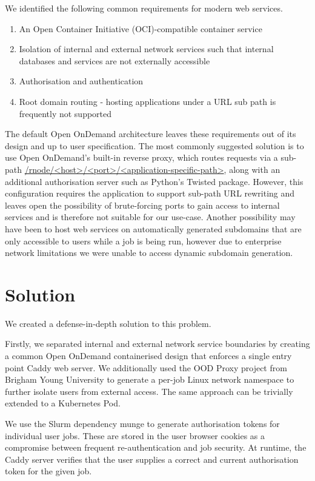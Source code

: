 \documentclass[sigconf,authordraft]{acmart}
\begin{document}
We identified the following common requirements for modern web services.
\begin{enumerate}
    \item An Open Container Initiative (OCI)-compatible container service
    \item Isolation of internal and external network services such that internal databases and services are not externally accessible
    \item Authorisation and authentication
    \item Root domain routing - hosting applications under a URL sub path is frequently not supported
\end{enumerate}
The default Open OnDemand architecture \cite{OODArch} leaves these requirements out of its design and up to user specification. The most commonly suggested solution is to use Open OnDemand's built-in reverse proxy, which routes requests via a sub-path \url{/rnode/<host>/<port>/<application-specific-path>}, along with an additional authorisation server such as Python's Twisted package. However, this configuration requires the application to support sub-path URL rewriting and leaves open the possibility of brute-forcing ports to gain access to internal services and is therefore not suitable for our use-case. Another possibility may have been to host web services on automatically generated subdomains that are only accessible to users while a job is being run, however due to enterprise network limitations we were unable to access dynamic subdomain generation.

\section{Solution}
We created a defense-in-depth solution to this problem.

Firstly, we separated internal and external network service boundaries by creating a common Open OnDemand containerised design that enforces a single entry point Caddy web server. We additionally used the OOD Proxy project from Brigham Young University \cite{noauthor_byuhpcoodproxy_2025} to generate a per-job Linux network namespace to further isolate users from external access. The same approach can be trivially extended to a Kubernetes Pod.

We use the Slurm dependency munge to generate authorisation tokens for individual user jobs. These are stored in the user browser cookies as a compromise between frequent re-authentication and job security. At runtime, the Caddy server verifies that the user supplies a correct and current authorisation token for the given job.
\end{document}
